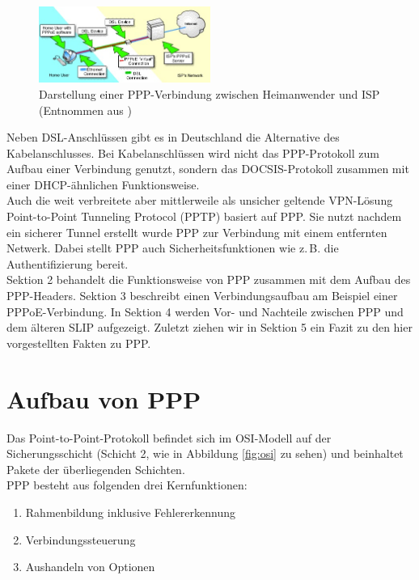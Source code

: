 \documentclass[journal,11pt]{IEEEtran}
\begin{document}
\begin{figure}[h!]
 \centering
  \includegraphics[width=0.5\textwidth]{img/PPP-Visualisierung}
 \caption{Darstellung einer PPP-Verbindung zwischen Heimanwender und ISP (Entnommen aus \cite{PPP-Bild})}
 \label{fig:PPP-Visualisierung}
\end{figure}
Neben DSL-Anschl\"ussen gibt es in Deutschland die Alternative des Kabelanschlusses. Bei Kabelanschl\"ussen wird nicht das PPP-Protokoll zum Aufbau einer Verbindung genutzt, sondern das DOCSIS-Protokoll zusammen mit einer DHCP-\"ahnlichen \cite{RFC3256} Funktionsweise. \\
Auch die weit verbreitete aber mittlerweile als unsicher geltende VPN-Lösung Point-to-Point Tunneling Protocol (PPTP) basiert auf PPP. Sie nutzt nachdem ein sicherer Tunnel erstellt wurde PPP zur Verbindung mit einem entfernten Netwerk. Dabei stellt PPP auch Sicherheitsfunktionen wie z.\,B. die Authentifizierung bereit.
\\
\newline
Sektion 2 behandelt die Funktionsweise von PPP zusammen mit dem Aufbau des PPP-Headers. Sektion 3 beschreibt einen Verbindungsaufbau am Beispiel einer PPPoE-Verbindung. In Sektion 4 werden Vor- und Nachteile zwischen PPP und dem \"alteren SLIP aufgezeigt. Zuletzt ziehen wir in Sektion 5 ein Fazit zu den hier vorgestellten Fakten zu PPP.



\section{Aufbau von PPP}
Das Point-to-Point-Protokoll befindet sich im OSI-Modell auf der Sicherungsschicht (Schicht 2, wie in Abbildung \ref{fig:osi} zu sehen) und beinhaltet Pakete der überliegenden Schichten.\\
PPP besteht aus folgenden drei Kernfunktionen:

\begin{enumerate}
    \item Rahmenbildung inklusive Fehlererkennung
    \item Verbindungssteuerung
    \item Aushandeln von Optionen
\end{enumerate}
\end{document}

